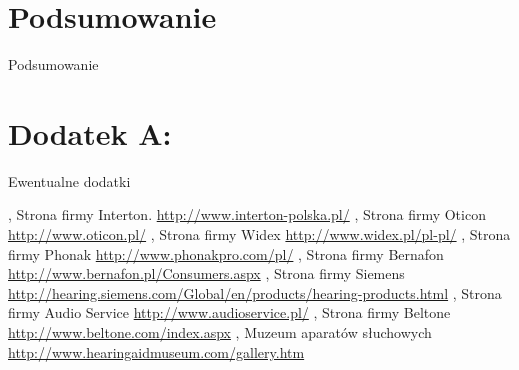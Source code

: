 \documentclass[journal]{IEEEtran}
\begin{document}
\section{Podsumowanie}

Podsumowanie

\section{Dodatek A: }

Ewentualne dodatki


\begin{thebibliography}{123}
    , Strona firmy Interton.
        \url{http://www.interton-polska.pl/}
    , Strona firmy Oticon
        \url{http://www.oticon.pl/}
    , Strona firmy Widex
        \url{http://www.widex.pl/pl-pl/}
    , Strona firmy Phonak
        \url{http://www.phonakpro.com/pl/}
    , Strona firmy Bernafon
        \url{http://www.bernafon.pl/Consumers.aspx}
    , Strona firmy Siemens
        \url{http://hearing.siemens.com/Global/en/products/hearing-products.html}
    , Strona firmy Audio Service
        \url{http://www.audioservice.pl/}
    , Strona firmy Beltone
        \url{http://www.beltone.com/index.aspx}
    , Muzeum aparatów słuchowych
        \url{http://www.hearingaidmuseum.com/gallery.htm}
\end{thebibliography}
\end{document}
